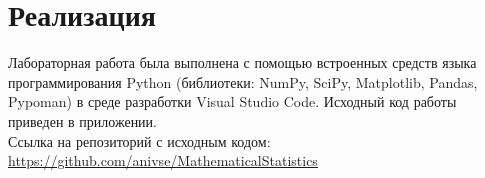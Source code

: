 \section{Реализация}

Лабораторная работа была выполнена с помощью встроенных средств языка программирования Python (библиотеки: NumPy, SciPy, Matplotlib, Pandas, Pypoman) в среде разработки Visual Studio Code. Исходный код работы приведен в приложении.\\

Ссылка на репозиторий с исходным кодом: \url{https://github.com/anivse/MathematicalStatistics}

